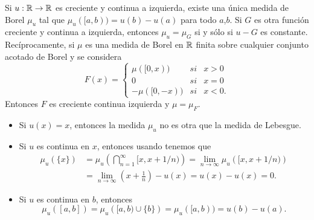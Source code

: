 \begin{thm}\label{medidas}
	Si $u:\mathbb{R} \to\mathbb{R}$ es creciente y continua a izquierda, existe una única medida de Borel $\mu_{u}$ tal que $\mu_{u}([a,b))=u(b)-u(a)$ para todo $a$,$b$. Si $G$ es otra función creciente y continua a izquierda, entonces  $\mu_{u}=\mu_{G}$ si y sólo si $u-G$ es constante. Recíprocamente, si $\mu$ es una medida de Borel  en $\mathbb{R}$ finita sobre cualquier conjunto acotado de Borel y se considera
	$$F(x)= \left\{ \begin{array}{lcc}
		\mu([0,x)) &   si  & x > 0 \\
		0 &   si& x = 0 \\
		-\mu([0,-x)) &   si  & x < 0. 
	\end{array}
	\right. $$
	Entonces $F$ es creciente  continua izquierda\deleted{,} y $\mu=\mu_{F}$.
\end{thm}  




%

\begin{obs} \vphantom{a}
	\begin{itemize} 
		\item Si $u(x)=x$, entonces la medida $\mu_{u}$ no es otra que la medida de Lebesgue.
		\item Si $u$ es continua   en $x$, entonces usando  \cite[Teorema 3.28]{Zo} tenemos que 		
		\begin{equation*}
            \begin{split}
			\mu_{u}(\{x\})&=\mu_{u}\left( \bigcap_{n=1}^{\infty}[x,x+1/n)\right) =\lim_{n \to \infty}\mu_{u}\left([x,x+1/n)\right)
			\\ &=\lim_{n \to \infty}\left(x+\frac{1}{n}\right)-u(x)=u(x)-u(x)=0.
            \end{split}
		\end{equation*}
		
		\item  Si $u$ es continua  en $b$, entonces 
		$$\mu_{u}([a,b])=\mu_{u}\left([a,b) \cup\{b\}\right)=\mu_{u}([a,b))=u(b)-u(a).$$		
	\end{itemize}
\end{obs}


